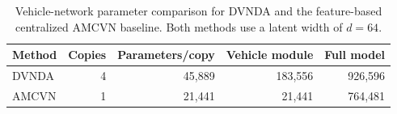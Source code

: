 \begin{table}[t]
\centering
\caption{Vehicle-network parameter comparison for DVNDA and the feature-based centralized AMCVN baseline. Both methods use a latent width of $d=64$.}
\label{tab:dvnda-amcvn-parameters}
\begin{tabular}{lrrrr}
\hline
Method & Copies & Parameters/copy & Vehicle module & Full model \\
\hline
DVNDA & 4 & 45,889 & 183,556 & 926,596 \\
AMCVN & 1 & 21,441 & 21,441 & 764,481 \\
\hline
\end{tabular}
\end{table}
